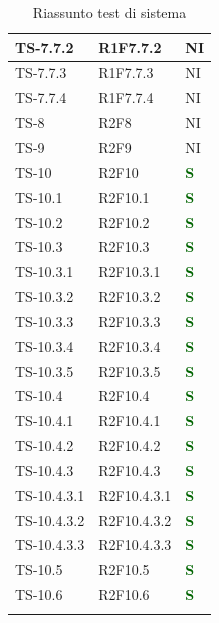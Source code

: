 \begin{longtable}{|C{2.5cm}|C{2.5cm}|C{2.5cm}|}
	\hline
	{TS-7.7.2} & {R1F7.7.2} & {NI}\\
	\hline
	{TS-7.7.3} & {R1F7.7.3} & {NI}\\
	\hline
	{TS-7.7.4} & {R1F7.7.4} & {NI}\\
	\hline
	{TS-8} & {R2F8} & {NI}\\
	\hline
	{TS-9} & {R2F9} & {NI}\\
	\hline
	{TS-10} & {R2F10} & \textcolor{darkgreen}{\textbf{S}}\\
	\hline
	{TS-10.1} & {R2F10.1} & \textcolor{darkgreen}{\textbf{S}}\\
	\hline
	{TS-10.2} & {R2F10.2} & \textcolor{darkgreen}{\textbf{S}}\\
	\hline
	{TS-10.3} & {R2F10.3} & \textcolor{darkgreen}{\textbf{S}}\\
	\hline
	{TS-10.3.1} & {R2F10.3.1} & \textcolor{darkgreen}{\textbf{S}}\\
	\hline
	{TS-10.3.2} & {R2F10.3.2} & \textcolor{darkgreen}{\textbf{S}}\\
	\hline
	{TS-10.3.3} & {R2F10.3.3} & \textcolor{darkgreen}{\textbf{S}}\\
	\hline
	{TS-10.3.4} & {R2F10.3.4} & \textcolor{darkgreen}{\textbf{S}}\\
	\hline
	{TS-10.3.5} & {R2F10.3.5} & \textcolor{darkgreen}{\textbf{S}}\\
	\hline
	{TS-10.4} & {R2F10.4} & \textcolor{darkgreen}{\textbf{S}}\\
	\hline
	{TS-10.4.1} & {R2F10.4.1} & \textcolor{darkgreen}{\textbf{S}}\\
	\hline
	{TS-10.4.2} & {R2F10.4.2} & \textcolor{darkgreen}{\textbf{S}}\\
	\hline
	{TS-10.4.3} & {R2F10.4.3} & \textcolor{darkgreen}{\textbf{S}}\\
	\hline
	{TS-10.4.3.1} & {R2F10.4.3.1} & \textcolor{darkgreen}{\textbf{S}}\\
	\hline
	{TS-10.4.3.2} & {R2F10.4.3.2} & \textcolor{darkgreen}{\textbf{S}}\\
	\hline
	{TS-10.4.3.3} & {R2F10.4.3.3} & \textcolor{darkgreen}{\textbf{S}}\\
	\hline
	{TS-10.5} & {R2F10.5} & \textcolor{darkgreen}{\textbf{S}}\\
	\hline
	{TS-10.6} & {R2F10.6} & \textcolor{darkgreen}{\textbf{S}}\\
	\hline
	\caption{Riassunto test di sistema}
	\label{tabella:riassunto TS}
\end{longtable}
\renewcommand{\arraystretch}{1}
